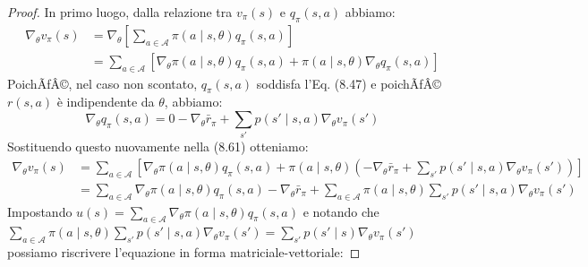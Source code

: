 ﻿\documentclass[11pt, a4paper]{report}
\begin{document}
\begin{proof}
In primo luogo, dalla relazione tra $v_{\pi}(s)$ e $q_{\pi}(s, a)$ abbiamo:
\begin{align*}
\nabla_{\theta} v_{\pi}(s) &= \nabla_{\theta} \left[ \sum_{a \in \mathcal{A}} \pi(a \mid s, \theta) q_{\pi}(s, a) \right] \\
&= \sum_{a \in \mathcal{A}} [\nabla_{\theta} \pi(a \mid s, \theta) q_{\pi}(s, a) + \pi(a \mid s, \theta) \nabla_{\theta} q_{\pi}(s, a)]
\end{align*}
PoichÃƒÂ©, nel caso non scontato, $q_{\pi}(s, a)$ soddisfa l'Eq. (8.47) e poichÃƒÂ© $r(s, a)$ è indipendente da $\theta$, abbiamo:
\begin{equation}
\nabla_{\theta} q_{\pi}(s, a) = 0 - \nabla_{\theta} \bar{r}_{\pi} + \sum_{s'} p(s' \mid s, a) \nabla_{\theta} v_{\pi}(s')
\end{equation}
Sostituendo questo nuovamente nella (8.61) otteniamo:
\begin{align*}
\nabla_{\theta} v_{\pi}(s) &= \sum_{a \in \mathcal{A}} \left[ \nabla_{\theta} \pi(a \mid s, \theta) q_{\pi}(s, a) + \pi(a \mid s, \theta) \left( -\nabla_{\theta} \bar{r}_{\pi} + \sum_{s'} p(s' \mid s, a) \nabla_{\theta} v_{\pi}(s') \right) \right] \\
&= \sum_{a \in \mathcal{A}} \nabla_{\theta} \pi(a \mid s, \theta) q_{\pi}(s, a) - \nabla_{\theta} \bar{r}_{\pi} + \sum_{a \in \mathcal{A}} \pi(a \mid s, \theta) \sum_{s'} p(s' \mid s, a) \nabla_{\theta} v_{\pi}(s')
\end{align*}
Impostando $u(s) = \sum_{a \in \mathcal{A}} \nabla_{\theta} \pi(a \mid s, \theta) q_{\pi}(s, a)$ e notando che $\sum_{a \in \mathcal{A}} \pi(a \mid s, \theta) \sum_{s'} p(s' \mid s, a) \nabla_{\theta} v_{\pi}(s') = \sum_{s'} p(s' \mid s) \nabla_{\theta} v_{\pi}(s')$ possiamo riscrivere l'equazione in forma matriciale-vettoriale:


\end{proof}
\end{document}
